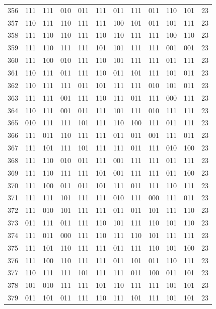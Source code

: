 \begin{longtable}{r*{10}{c}r}
356 & 111 & 111 & 010 & 011 & 111 & 011 & 111 & 011 & 110 & 101 & 23\\
357 & 110 & 111 & 110 & 111 & 111 & 100 & 101 & 011 & 101 & 111 & 23\\
358 & 111 & 110 & 110 & 111 & 110 & 110 & 111 & 111 & 100 & 110 & 23\\
359 & 111 & 110 & 111 & 111 & 101 & 101 & 111 & 111 & 001 & 001 & 23\\
360 & 111 & 100 & 010 & 111 & 110 & 101 & 111 & 111 & 011 & 111 & 23\\
361 & 110 & 111 & 011 & 111 & 110 & 011 & 101 & 111 & 101 & 011 & 23\\
362 & 110 & 111 & 111 & 011 & 101 & 111 & 111 & 010 & 101 & 011 & 23\\
363 & 111 & 111 & 001 & 111 & 110 & 111 & 011 & 111 & 000 & 111 & 23\\
364 & 110 & 111 & 001 & 011 & 111 & 101 & 111 & 010 & 111 & 111 & 23\\
365 & 010 & 111 & 111 & 101 & 111 & 110 & 100 & 111 & 011 & 111 & 23\\
366 & 111 & 011 & 110 & 111 & 111 & 011 & 011 & 001 & 111 & 011 & 23\\
367 & 111 & 101 & 111 & 101 & 111 & 111 & 011 & 111 & 010 & 100 & 23\\
368 & 111 & 110 & 010 & 011 & 111 & 001 & 111 & 111 & 011 & 111 & 23\\
369 & 111 & 110 & 111 & 111 & 101 & 001 & 111 & 111 & 011 & 100 & 23\\
370 & 111 & 100 & 011 & 011 & 101 & 111 & 011 & 111 & 110 & 111 & 23\\
371 & 111 & 111 & 101 & 111 & 111 & 010 & 111 & 000 & 111 & 011 & 23\\
372 & 111 & 010 & 101 & 111 & 111 & 011 & 011 & 101 & 111 & 110 & 23\\
373 & 011 & 111 & 011 & 111 & 110 & 101 & 111 & 110 & 101 & 110 & 23\\
374 & 111 & 011 & 000 & 111 & 110 & 111 & 110 & 101 & 111 & 111 & 23\\
375 & 111 & 101 & 110 & 111 & 111 & 011 & 111 & 110 & 101 & 100 & 23\\
376 & 111 & 100 & 110 & 111 & 111 & 011 & 101 & 011 & 110 & 111 & 23\\
377 & 110 & 111 & 111 & 101 & 111 & 111 & 011 & 100 & 011 & 101 & 23\\
378 & 101 & 010 & 111 & 111 & 101 & 110 & 111 & 111 & 101 & 101 & 23\\
379 & 011 & 101 & 011 & 111 & 110 & 111 & 101 & 111 & 101 & 101 & 23\\

\end{longtable}
